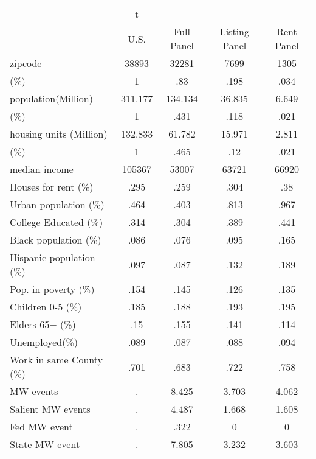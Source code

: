 \begin{tabular}{l*{4}{c}}
\hline\hline
            &           t&            &            &            \\
            &        U.S.&  Full Panel&Listing Panel&  Rent Panel\\
\hline
zipcode     &       38893&       32281&        7699&        1305\\
(\%)        &           1&         .83&        .198&        .034\\
population(Million)&     311.177&     134.134&      36.835&       6.649\\
(\%)        &           1&        .431&        .118&        .021\\
housing units (Million)&     132.833&      61.782&      15.971&       2.811\\
(\%)        &           1&        .465&         .12&        .021\\
median income&      105367&       53007&       63721&       66920\\
Houses for rent (\%)&        .295&        .259&        .304&         .38\\
Urban population (\%)&        .464&        .403&        .813&        .967\\
College Educated (\%)&        .314&        .304&        .389&        .441\\
Black population (\%)&        .086&        .076&        .095&        .165\\
Hispanic population (\%)&        .097&        .087&        .132&        .189\\
Pop. in poverty (\%)&        .154&        .145&        .126&        .135\\
Children 0-5 (\%)&        .185&        .188&        .193&        .195\\
Elders 65+ (\%)&         .15&        .155&        .141&        .114\\
Unemployed(\%)&        .089&        .087&        .088&        .094\\
Work in same County (\%)&        .701&        .683&        .722&        .758\\
MW events   &           .&       8.425&       3.703&       4.062\\
Salient MW events&           .&       4.487&       1.668&       1.608\\
Fed MW event&           .&        .322&           0&           0\\
State MW event&           .&       7.805&       3.232&       3.603\\

\end{tabular}

